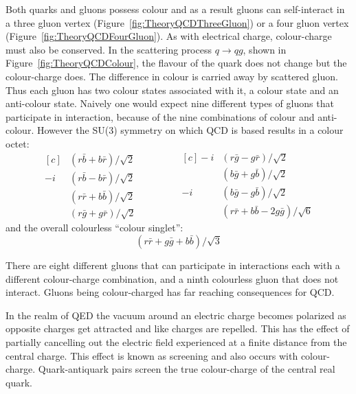 Both quarks and gluons possess colour and as a result gluons can self-interact in a three gluon vertex (Figure~\ref{fig:TheoryQCDThreeGluon}) or a four gluon vertex (Figure~\ref{fig:TheoryQCDFourGluon}). As with electrical charge, colour-charge must also be conserved. In the scattering process $q\rightarrow qg$, shown in Figure~\ref{fig:TheoryQCDColour}, the flavour of the quark does not change but the colour-charge does. The difference in colour is carried away by scattered gluon. Thus each gluon has two colour states associated with it, a colour state and an anti-colour state. Naively one would expect nine different types of gluons that participate in interaction, because of the nine combinations of colour and anti-colour. However the SU(3) symmetry on which QCD is based results in a colour octet:
%
\begin{equation}
  \begin{aligned}[c]
    &(r\bar{b}+b\bar{r})/\sqrt{2} \\
    -i&(r\bar{b}-b\bar{r})/\sqrt{2} \\
    &(r\bar{r}+b\bar{b})/\sqrt{2} \\
    &(r\bar{g}+g\bar{r})/\sqrt{2}
  \end{aligned}
  \qquad\qquad
  \begin{aligned}[c]
    -i&(r\bar{g}-g\bar{r})/\sqrt{2} \\
    &(b\bar{g}+g\bar{b})/\sqrt{2} \\
    -i&(b\bar{g}-g\bar{b})/\sqrt{2} \\
    &(r\bar{r}+b\bar{b}-2g\bar{g})/\sqrt{6}
  \end{aligned}
\end{equation}
%
and the overall colourless ``colour singlet'':
%
\begin{equation}
  (r\bar{r} + g\bar{g} + b\bar{b})/\sqrt{3}
\end{equation}

There are eight different gluons that can participate in interactions each with a different colour-charge combination, and a ninth colourless gluon that does not interact. Gluons being colour-charged has far reaching consequences for QCD.

In the realm of QED the vacuum around an electric charge becomes polarized as opposite charges get attracted and like charges are repelled. This has the effect of partially cancelling out the electric field experienced at a finite distance from the central charge. This effect is known as screening and also occurs with colour-charge. Quark-antiquark pairs screen the true colour-charge of the central real quark.


